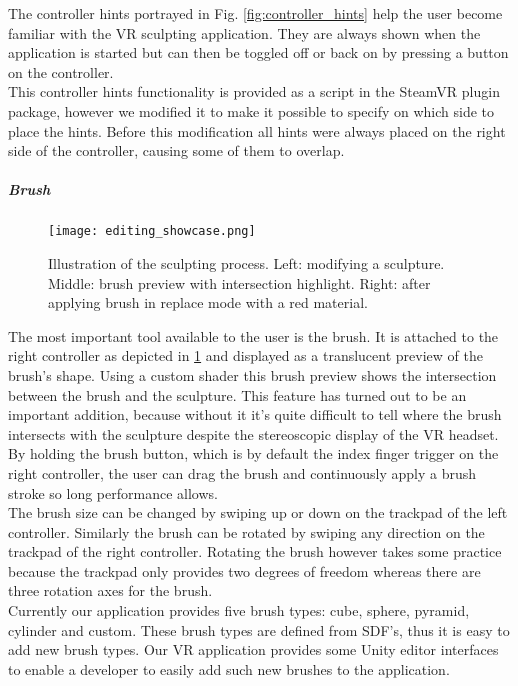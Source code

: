 The controller hints portrayed in Fig. \ref{fig:controller_hints} help the user become familiar with the VR sculpting application. They are always shown when the application is started but can then be toggled off or back on by pressing a button on the controller.\\
This controller hints functionality is provided as a script in the SteamVR plugin package, however we modified it to make it possible to specify on which side to place the hints. Before this modification all hints were always placed on the right side of the controller, causing some of them to overlap.

\subparagraph{Brush}

\begin{figure}
\centering
\captionsetup{width=0.8\textwidth}
\texttt{[image: editing\_showcase.png]}
\caption{Illustration of the sculpting process. Left: modifying a sculpture. Middle: brush preview with intersection highlight. Right: after applying brush in replace mode with a red material.}
\label{fig:editing_showcase}
\end{figure}

The most important tool available to the user is the brush. It is attached to the right controller as depicted in \ref{fig:editing_showcase} and displayed as a translucent preview of the brush's shape. Using a custom shader this brush preview shows the intersection between the brush and the sculpture. This feature has turned out to be an important addition, because without it it's quite difficult to tell where the brush intersects with the sculpture despite the stereoscopic display of the VR headset.\\
By holding the brush button, which is by default the index finger trigger on the right controller, the user can drag the brush and continuously apply a brush stroke so long performance allows.\\
The brush size can be changed by swiping up or down on the trackpad of the left controller. Similarly the brush can be rotated by swiping any direction on the trackpad of the right controller. Rotating the brush however takes some practice because the trackpad only provides two degrees of freedom whereas there are three rotation axes for the brush.\\
Currently our application provides five brush types: cube, sphere, pyramid, cylinder and custom. These brush types are defined from SDF's, thus it is easy to add new brush types. Our VR application provides some Unity editor interfaces to enable a developer to easily add such new brushes to the application.

